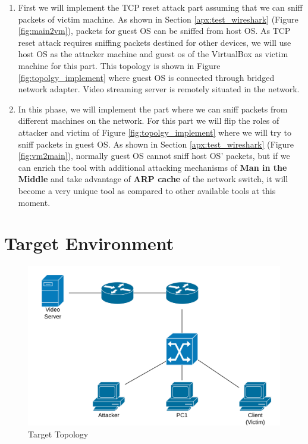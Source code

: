 \documentclass[14pt]{extarticle}
\begin{document}
    
    \begin{enumerate}
      
      \item First we will implement the TCP reset attack part assuming that we can sniff packets of victim machine. As shown in Section \ref{apx:test_wireshark} (Figure \ref{fig:main2vm}), packets for guest OS can be sniffed from host OS. As TCP reset attack requires sniffing packets destined for other devices, we will use host OS as the attacker machine and guest os of the VirtualBox as victim machine for this part. This topology is shown in Figure \ref{fig:topolgy_implement} where guest OS is connected through bridged network adapter. Video streaming server is remotely situated in the network.
      
      \item In this phase, we will implement the part where we can sniff packets from different machines on the network. For this part we will flip the roles of attacker and victim of Figure \ref{fig:topolgy_implement} where we will try to sniff packets in guest OS. As shown in Section \ref{apx:test_wireshark} (Figure \ref{fig:vm2main}), normally guest OS cannot sniff host OS' packets, but if we can enrich the tool with additional attacking mechanisms of \textbf{Man in the Middle} and take advantage of \textbf{ARP cache} of the network switch, it will become a very unique tool as compared to other available tools at this moment.
      
      \end{enumerate}
    
    
\section{Target Environment}
    \label{sec:target_environment}
    \begin{figure}[!h]
        \centering
        \includegraphics[width=.95\textwidth]{Pictures/TCP_RST_Topology_Easy.png}
        \caption{Target Topology}
        \label{fig:topology}
    \end{figure}
    
\end{document}
